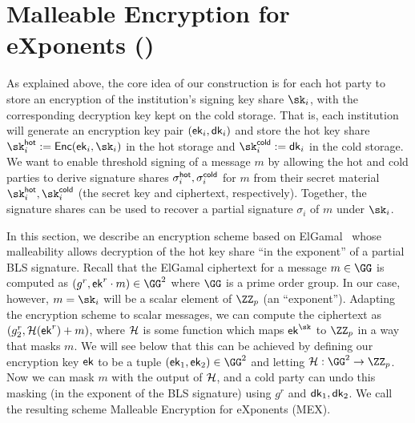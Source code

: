 \section{Malleable Encryption for eXponents (\mex)}\label{sec:mex}

As explained above, the core idea of our construction is for each hot party to store an encryption of the institution's signing key share $\sk_i$, with the corresponding decryption key kept on the cold storage.
That is, each institution will generate an encryption key pair $(\mathsf{ek}_i, \mathsf{dk}_i)$ and store the hot key share $\sk_i^\hot := \enc(\ek_i, \sk_i)$ in the hot storage and $\sk_i^\cold := \dk_i$ in the cold storage.
We want to enable threshold signing of a message $m$ by allowing the hot and cold parties to derive signature shares $\sigma_i^{\mathsf{hot}}, \sigma_i^{\mathsf{cold}}$ for $m$ from their secret material $\sk_i^\hot, \sk_i^\cold$ (the secret key and ciphertext, respectively). Together, the signature shares can be used to recover a partial signature $\sigma_i$ of $m$ under $\sk_i$.

In this section, we describe an encryption scheme based on ElGamal~\cite{C:ElGamal84} whose malleability allows decryption of the hot key share ``in the exponent'' of a partial BLS signature.
Recall that the ElGamal ciphertext for a message $m \in \GG$ is computed as $(g^r, \ek^r \cdot m) \in \GG^2$ where $\GG$ is a prime order group. In our case, however, $m = \sk_i$ will be a scalar element of $\ZZ_p$ (an ``exponent'').
Adapting the encryption scheme to scalar messages, we can compute the ciphertext as $(g_2^r, \mathcal{H}(\mathsf{ek}^r) + m)$, where $\mathcal{H}$ is some function which maps $\ek^{\sk}$ to $\ZZ_p$ in a way that masks $m$. 
We will see below that this can be achieved by defining our encryption key $\mathsf{ek}$ to be a tuple $(\ek_1, \ek_2) \in \GG^2$ and letting $\lhlhash: \GG^2 \to \ZZ_p$.
Now we can mask $m$ with the output of $\mathcal{H}$, and a cold party can undo this masking (in the exponent of the BLS signature) using $g^r$ and $\mathsf{dk}_1, \mathsf{dk}_2$.
We call the resulting scheme Malleable Encryption for eXponents (MEX).

